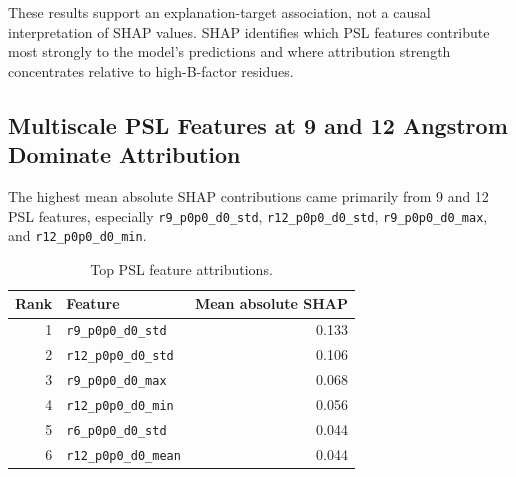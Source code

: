 \documentclass[11pt]{article}
\newcommand{\angstrom}{\text{\normalfont\AA}\xspace}
\begin{document}
\begin{table}[htbp]
\centering
\caption{SHAP explanation-target agreement.}
\label{tab:shap_alignment}
\end{table}

These results support an explanation-target association, not a causal interpretation of SHAP values. SHAP identifies which PSL features contribute most strongly to the model's predictions and where attribution strength concentrates relative to high-B-factor residues.

\subsection{Multiscale PSL Features at 9 and 12 Angstrom Dominate Attribution}
The highest mean absolute SHAP contributions came primarily from 9 and
12~\angstrom PSL features, especially \texttt{r9\_p0p0\_d0\_std},
\texttt{r12\_p0p0\_d0\_std}, \texttt{r9\_p0p0\_d0\_max}, and
\texttt{r12\_p0p0\_d0\_min}.

\begin{table}[htbp]
\centering
\caption{Top PSL feature attributions.}
\label{tab:shap_features}
\begin{tabular}{rlr}
\toprule
Rank & Feature & Mean absolute SHAP \\
\midrule
1 & \texttt{r9\_p0p0\_d0\_std} & 0.133 \\
2 & \texttt{r12\_p0p0\_d0\_std} & 0.106 \\
3 & \texttt{r9\_p0p0\_d0\_max} & 0.068 \\
4 & \texttt{r12\_p0p0\_d0\_min} & 0.056 \\
5 & \texttt{r6\_p0p0\_d0\_std} & 0.044 \\
6 & \texttt{r12\_p0p0\_d0\_mean} & 0.044 \\
\bottomrule
\end{tabular}
\end{table}
\end{document}
